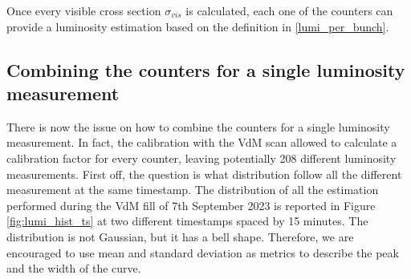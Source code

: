 Once every visible cross section $\sigma_{vis}$ is calculated, each one of the counters can provide a luminosity estimation based on the definition in \eqref{lumi_per_bunch}.

\subsection{Combining the counters for a single luminosity measurement}
There is now the issue on how to combine the counters for a single luminosity measurement. In fact, the calibration with the VdM scan allowed to calculate a calibration factor for every counter, leaving potentially 208 different luminosity measurements. 
First off, the question is what distribution follow all the different measurement at the same timestamp. 
The distribution of all the estimation performed during the VdM fill of 7th September 2023 is reported in Figure \ref{fig:lumi_hist_ts} at two different timestamps spaced by 15 minutes. The distribution is not Gaussian, but it has a bell shape. Therefore, we are encouraged to use mean and standard deviation as metrics to describe the peak and the width of the curve. 


